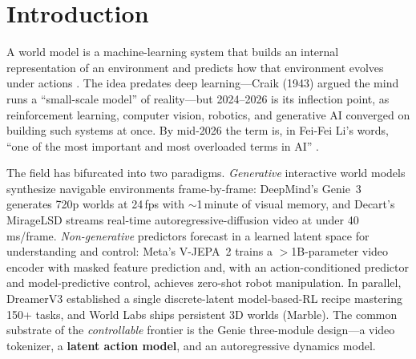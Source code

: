 \documentclass[11pt]{article}
\begin{document}
\section{Introduction}
A world model is a machine-learning system that builds an internal representation
of an environment and predicts how that environment evolves under actions
\cite{ha2018world,lecun2022path}. The idea predates deep learning---Craik (1943)
argued the mind runs a ``small-scale model'' of reality---but 2024--2026 is its
inflection point, as reinforcement learning, computer vision, robotics, and
generative AI converged on building such systems at once. By mid-2026 the term is,
in Fei-Fei Li's words, ``one of the most important and most overloaded terms in
AI'' \cite{worldlabs2026taxonomy}.

The field has bifurcated into two paradigms. \emph{Generative} interactive world
models synthesize navigable environments frame-by-frame: DeepMind's Genie~3
\cite{genie3} generates 720p worlds at 24\,fps with $\sim$1\,minute of visual
memory, and Decart's MirageLSD streams real-time autoregressive-diffusion video at
under 40\,ms/frame. \emph{Non-generative} predictors forecast in a learned latent
space for understanding and control: Meta's V-JEPA~2 \cite{vjepa2} trains a
$>$1B-parameter video encoder with masked feature prediction and, with an
action-conditioned predictor and model-predictive control, achieves zero-shot
robot manipulation. In parallel, DreamerV3 \cite{hafner2025dreamerv3} established a
single discrete-latent model-based-RL recipe mastering 150+ tasks, and World Labs
ships persistent 3D worlds (Marble). The common substrate of the \emph{controllable}
frontier is the Genie three-module design---a video tokenizer, a \textbf{latent
action model}, and an autoregressive dynamics model.
\end{document}
